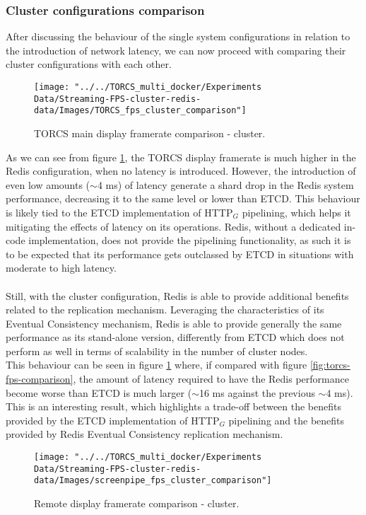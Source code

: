 \subsubsection{Cluster configurations comparison}
After discussing the behaviour of the single system configurations in relation to the introduction of network latency, we can now proceed with comparing their cluster configurations with each other.
\begin{figure}[h!]
	\centering
	\texttt{[image: "../../TORCS\_multi\_docker/Experiments Data/Streaming-FPS-cluster-redis-data/Images/TORCS\_fps\_cluster\_comparison"]}
	\caption[TORCS main display framerate comparison - cluster]{TORCS main display framerate comparison - cluster.}
	\label{fig:torcs-fps-cluster-comparison}
\end{figure}
As we can see from figure \ref{fig:torcs-fps-cluster-comparison}, the TORCS display framerate is much higher in the Redis configuration, when no latency is introduced. However, the introduction of even low amounts ($\sim{}$4 ms) of latency generate a shard drop in the Redis system performance, decreasing it to the same level or lower than ETCD. This behaviour is likely tied to the ETCD implementation of HTTP$_G$ pipelining, which helps it mitigating the effects of latency on its operations. Redis, without a dedicated in-code implementation, does not provide the pipelining functionality, as such it is to be expected that its performance gets outclassed by ETCD in situations with moderate to high latency. \\ \\
Still, with the cluster configuration, Redis is able to provide additional benefits related to the replication mechanism. Leveraging the characteristics of its Eventual Consistency mechanism, Redis is able to provide generally the same performance as its stand-alone version, differently from ETCD which does not perform as well in terms of scalability in the number of cluster nodes. \\
This behaviour can be seen in figure \ref{fig:torcs-fps-cluster-comparison} where, if compared with figure \ref{fig:torcs-fps-comparison}, the amount of latency required to have the Redis performance become worse than ETCD is much larger ($\sim{}$16 ms against the previous $\sim{}$4 ms). This is an interesting result, which highlights a trade-off between the benefits provided by the ETCD implementation of HTTP$_G$ pipelining and the benefits provided by Redis Eventual Consistency replication mechanism.
\begin{figure}[h!]
	\centering
	\texttt{[image: "../../TORCS\_multi\_docker/Experiments Data/Streaming-FPS-cluster-redis-data/Images/screenpipe\_fps\_cluster\_comparison"]}
	\caption[Remote display framerate comparison - cluster]{Remote display framerate comparison - cluster.}
	\label{fig:screenpipe-fps-cluster-comparison}
\end{figure}


